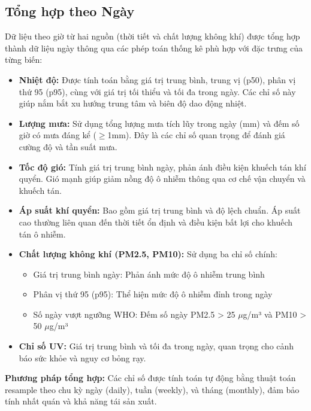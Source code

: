 \documentclass[12pt,a4paper]{article}
\begin{document}
\subsection{Tổng hợp theo Ngày}

Dữ liệu theo giờ từ hai nguồn (thời tiết và chất lượng không khí) được tổng hợp thành dữ liệu ngày thông qua các phép toán thống kê phù hợp với đặc trưng của từng biến:

\begin{itemize}
    \item \textbf{Nhiệt độ:} Được tính toán bằng giá trị trung bình, trung vị (p50), phân vị thứ 95 (p95), cùng với giá trị tối thiểu và tối đa trong ngày. Các chỉ số này giúp nắm bắt xu hướng trung tâm và biên độ dao động nhiệt.
    
    \item \textbf{Lượng mưa:} Sử dụng tổng lượng mưa tích lũy trong ngày (mm) và đếm số giờ có mưa đáng kể ($\geq$1mm). Đây là các chỉ số quan trọng để đánh giá cường độ và tần suất mưa.
    
    \item \textbf{Tốc độ gió:} Tính giá trị trung bình ngày, phản ánh điều kiện khuếch tán khí quyển. Gió mạnh giúp giảm nồng độ ô nhiễm thông qua cơ chế vận chuyển và khuếch tán.
    
    \item \textbf{Áp suất khí quyển:} Bao gồm giá trị trung bình và độ lệch chuẩn. Áp suất cao thường liên quan đến thời tiết ổn định và điều kiện bất lợi cho khuếch tán ô nhiễm.
    
    \item \textbf{Chất lượng không khí (PM2.5, PM10):} Sử dụng ba chỉ số chính:
    \begin{itemize}
        \item Giá trị trung bình ngày: Phản ánh mức độ ô nhiễm trung bình
        \item Phân vị thứ 95 (p95): Thể hiện mức độ ô nhiễm đỉnh trong ngày
        \item Số ngày vượt ngưỡng WHO: Đếm số ngày PM2.5 > 25 $\mu$g/m³ và PM10 > 50 $\mu$g/m³
    \end{itemize}
    
    \item \textbf{Chỉ số UV:} Giá trị trung bình và tối đa trong ngày, quan trọng cho cảnh báo sức khỏe và nguy cơ bỏng rạy.
\end{itemize}

\textbf{Phương pháp tổng hợp:} Các chỉ số được tính toán tự động bằng thuật toán resample theo chu kỳ ngày (daily), tuần (weekly), và tháng (monthly), đảm bảo tính nhất quán và khả năng tái sản xuất.
\end{document}
